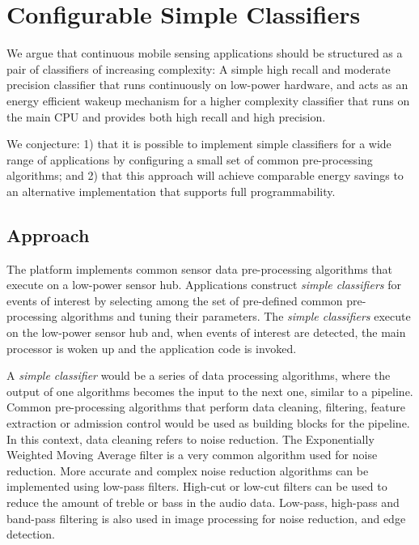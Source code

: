 \section{Configurable Simple Classifiers}
\label{sec:conjecture}

We argue that continuous mobile sensing applications should be
structured as a pair of classifiers of increasing complexity: A simple
high recall and moderate precision classifier that runs continuously
on low-power hardware, and acts as an energy efficient wakeup
mechanism for a higher complexity classifier that runs on the main CPU
and provides both high recall and high precision.

We conjecture: 1) that it is possible to implement simple classifiers for a 
wide range of applications by configuring a small set of common pre-processing 
algorithms; and  2) that this approach will achieve comparable energy 
savings to an alternative implementation that supports full programmability.

\subsection {Approach}

The platform implements common sensor data pre-processing algorithms that
execute on a low-power sensor hub.  Applications construct 
{\em  simple classifiers} for events of interest by selecting among the
set of pre-defined common pre-processing algorithms and tuning their
parameters.  The {\em simple classifiers} execute on the
low-power sensor hub and, when events of interest are detected, the
main processor is woken up and the application code is invoked.
  
A {\em simple classifier} would be a series of data processing algorithms, 
where the output of one algorithms becomes the input to the next one, similar
to a pipeline.  Common pre-processing algorithms that perform data cleaning, 
filtering, feature extraction or admission control would be used as building 
blocks for the pipeline.  In this context, data cleaning refers to noise 
reduction.  The Exponentially Weighted Moving Average filter
is a very common algorithm used for noise reduction.  More accurate and complex
noise reduction algorithms can be implemented using low-pass filters.  High-cut
or low-cut filters can be used to reduce the amount of treble or bass in the
audio data.  Low-pass, high-pass and band-pass filtering is also used in image 
processing for noise reduction, and edge detection.  


